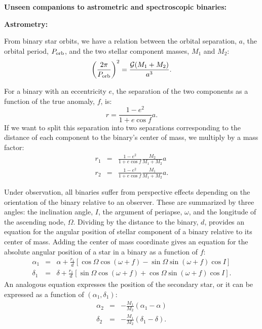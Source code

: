 \documentclass[12pt,preprint]{hackaastex}
\newcommand{\Porb}{\ifmmode {P_{\rm orb}}\else${P_{\rm orb}}$\fi}
\begin{document}
\begin{center}
{\large \textbf{\sc Unseen companions to astrometric and spectroscopic binaries:}}
\end{center}
\normalsize

\vspace{-0.1in}


{\large \textbf{ Astrometry:}}



From binary star orbits, we have a relation between the orbital separation, $a$, the orbital period, \Porb, and the two stellar component masses, $M_1$ and $M_2$:
\begin{equation}
\left( \frac{2 \pi}{\Porb} \right)^2 = \frac{\mathcal{G} (M_1 + M_2) }{a^3}. \label{eq:kepler_3}
\end{equation}

For a binary with an eccentricity $e$, the separation of the two components as a function of the true anomaly, $f$, is:
\begin{equation}
r = \frac{1-e^2}{1+e \cos f} a.
\end{equation} 
If we want to split this separation into two separations corresponding to the distance of each component to the binary's center of mass, we multiply by a mass factor:
\begin{eqnarray}
r_1 &=& \frac{1-e^2}{1+e \cos f} \frac{M_2}{M_1+M_2} a \nonumber \\
r_2 &=& \frac{1-e^2}{1+e \cos f} \frac{M_1}{M_1+M_2} a.
\end{eqnarray}


Under observation, all binaries suffer from perspective effects depending on the orientation of the binary relative to an observer. These are summarized by three angles: the inclination angle, $I$, the argument of periapse, $\omega$, and the longitude of the ascending node, $\Omega$. Dividing by the distance to the binary, $d$, provides an equation for the angular position of stellar component of a binary relative to its center of mass. Adding the center of mass coordinate gives an equation for the absolute angular position of a star in a binary as a function of $f$:
\begin{eqnarray}
\alpha_1 &=& \alpha + \frac{r_1}{d} \left[ \cos \Omega \cos (\omega+f) - \sin \Omega \sin(\omega+f) \cos I \right] \nonumber \\
\delta_1 &=& \delta + \frac{r_1}{d} \left[ \sin \Omega \cos (\omega+f) + \cos \Omega \sin(\omega+f) \cos I \right].
\end{eqnarray}
An analogous equation expresses the position of the secondary star, or it can be expressed as a function of $(\alpha_1, \delta_1)$:
\begin{eqnarray}
\alpha_2 &=& -\frac{M_1}{M_2}(\alpha_1 - \alpha) \nonumber \\
\delta_2 &=& -\frac{M_1}{M_2}(\delta_1 - \delta).
\end{eqnarray}
\end{document}
